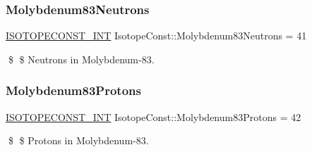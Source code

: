 \subsubsection{\texorpdfstring{Molybdenum83\+Neutrons}{Molybdenum83Neutrons}}
{\footnotesize\ttfamily \mbox{\hyperlink{group___isotope_const-_macros_ga5f18360b3e99483a35c32d789e62621c}{I\+S\+O\+T\+O\+P\+E\+C\+O\+N\+S\+T\+\_\+\+I\+NT}} Isotope\+Const\+::\+Molybdenum83\+Neutrons = 41}

\$ \$ Neutrons in Molybdenum-\/83. \mbox{\label{group___isotope_const-_molybdenum-_mo83_ga29edabf730d6a38b40b2037c1b6c70ee}} 
\subsubsection{\texorpdfstring{Molybdenum83\+Protons}{Molybdenum83Protons}}
{\footnotesize\ttfamily \mbox{\hyperlink{group___isotope_const-_macros_ga5f18360b3e99483a35c32d789e62621c}{I\+S\+O\+T\+O\+P\+E\+C\+O\+N\+S\+T\+\_\+\+I\+NT}} Isotope\+Const\+::\+Molybdenum83\+Protons = 42}

\$ \$ Protons in Molybdenum-\/83. 